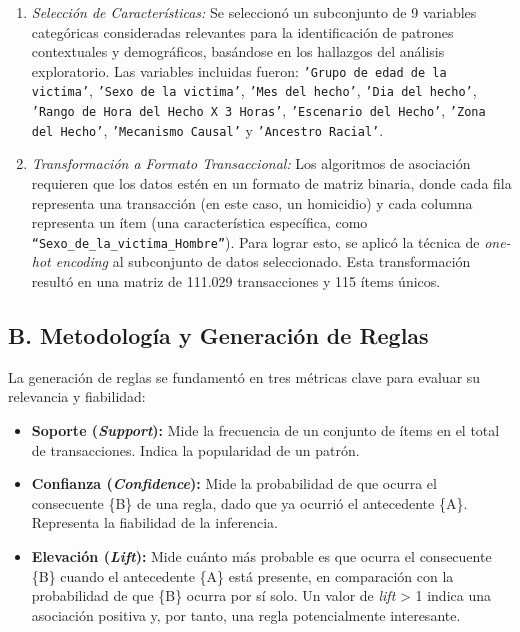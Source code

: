\documentclass[lettersize,journal]{IEEEtran}
\begin{document}
\begin{enumerate}
    \item[1.)] \textit{Selección de Características:} Se seleccionó un subconjunto de 9 variables categóricas consideradas relevantes para la identificación de patrones contextuales y demográficos, basándose en los hallazgos del análisis exploratorio. Las variables incluidas fueron: \texttt{'Grupo de edad de la victima'}, \texttt{'Sexo de la victima'}, \texttt{'Mes del hecho'}, \texttt{'Dia del hecho'}, \texttt{'Rango de Hora del Hecho X 3 Horas'}, \texttt{'Escenario del Hecho'}, \texttt{'Zona del Hecho'}, \texttt{'Mecanismo Causal'} y \texttt{'Ancestro Racial'}.

    \item[2.)] \textit{Transformación a Formato Transaccional:} Los algoritmos de asociación requieren que los datos estén en un formato de matriz binaria, donde cada fila representa una transacción (en este caso, un homicidio) y cada columna representa un ítem (una característica específica, como \texttt{``Sexo\_de\_la\_victima\_Hombre''}). Para lograr esto, se aplicó la técnica de \textit{one-hot encoding} al subconjunto de datos seleccionado. Esta transformación resultó en una matriz de 111.029 transacciones y 115 ítems únicos.
\end{enumerate}

\subsection*{B. Metodología y Generación de Reglas}

La generación de reglas se fundamentó en tres métricas clave para evaluar su relevancia y fiabilidad:

\begin{itemize}
    \item \textbf{Soporte (\textit{Support}):} Mide la frecuencia de un conjunto de ítems en el total de transacciones. Indica la popularidad de un patrón.
    \item \textbf{Confianza (\textit{Confidence}):} Mide la probabilidad de que ocurra el consecuente \{B\} de una regla, dado que ya ocurrió el antecedente \{A\}. Representa la fiabilidad de la inferencia.
    \item \textbf{Elevación (\textit{Lift}):} Mide cuánto más probable es que ocurra el consecuente \{B\} cuando el antecedente \{A\} está presente, en comparación con la probabilidad de que \{B\} ocurra por sí solo. Un valor de \textit{lift} \textgreater{} 1 indica una asociación positiva y, por tanto, una regla potencialmente interesante.
\end{itemize}
\end{document}

